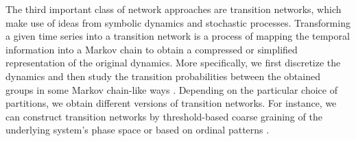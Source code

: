 	The third important class of network approaches are transition networks, which make use of ideas from symbolic dynamics and stochastic processes. Transforming a given time series into a transition network is a process of mapping the temporal information into a Markov chain to obtain a compressed or simplified representation of the original dynamics. More specifically, we first discretize the dynamics and then study the transition probabilities between the obtained groups in some Markov chain-like ways \cite{Nicolis2005}. Depending on the particular choice of partitions, we obtain different versions of transition networks. For instance, we can construct transition networks by threshold-based coarse graining of the underlying system's phase space \cite{Donner2011} or based on ordinal patterns \cite{McCullough2015,Kulp2016b}. 

